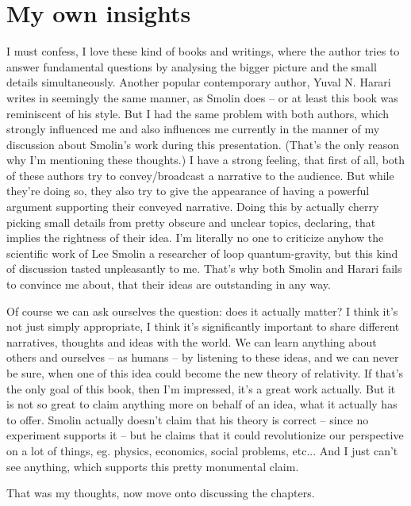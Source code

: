 \section{My own insights}
I must confess, I love these kind of books and writings, where the author tries to answer fundamental questions by analysing the bigger picture and the small details simultaneously. Another popular contemporary author, Yuval N. Harari writes in seemingly the same manner, as Smolin does -- or at least this book was reminiscent of his style. But I had the same problem with both authors, which strongly influenced me and also influences me currently in the manner of my discussion about Smolin's work during this presentation. (That's the only reason why I'm mentioning these thoughts.) I have a strong feeling, that first of all, both of these authors try to convey/broadcast a narrative to the audience. But while they're doing so, they also try to give the appearance of having a powerful argument supporting their conveyed narrative. Doing this by actually cherry picking small details from pretty obscure and unclear topics, declaring, that  implies the rightness of their idea. I'm literally no one to criticize anyhow the scientific work of Lee Smolin a researcher of loop quantum-gravity, but this kind of discussion tasted unpleasantly  to me. That's why both Smolin and Harari fails to convince me about, that their ideas are outstanding in any way. \par
Of course we can ask ourselves the question: does it actually matter? I think it's not just simply appropriate, I think it's significantly important to share different narratives, thoughts and ideas with the world. We can learn anything about others and ourselves -- as humans -- by listening to these ideas, and we can never be sure, when one of this idea could become the new theory of relativity. If that's the only goal of this book, then I'm impressed, it's a great work actually. But it is not so great to claim anything more on behalf of an idea, what it actually has to offer. Smolin actually doesn't claim that his theory is correct -- since no experiment supports it -- but he claims that it could revolutionize our perspective on a lot of things, eg. physics, economics, social problems, etc... And I just can't see anything, which supports this pretty monumental claim. \par
That was my thoughts, now move onto discussing the chapters.


